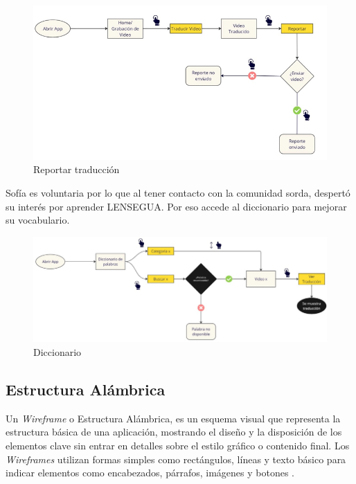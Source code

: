 \begin{figure} [H]
    \centering
    \includegraphics[width=1\linewidth]{figuras/flujo_usuario7.png}
    \caption{Reportar traducción}
    \label{fig:enter-label}
\end{figure}


Sofía es voluntaria por lo que al tener contacto con la comunidad sorda, despertó su interés por aprender LENSEGUA. Por eso accede al diccionario para mejorar su vocabulario. 


\begin{figure} [H]
    \centering
    \includegraphics[width=1\linewidth]{figuras/flujo_usuario8.png}
    \caption{Diccionario}
    \label{fig:enter-label}
\end{figure}



\subsection{Estructura Alámbrica}

Un \textit{Wireframe} o Estructura Alámbrica, es un esquema visual que representa la estructura básica de una aplicación, mostrando el diseño y la disposición de los elementos clave sin entrar en detalles sobre el estilo gráfico o contenido final. Los \textit{Wireframes} utilizan formas simples como rectángulos, líneas y texto básico para indicar elementos como encabezados, párrafos, imágenes y botones \cite{Rees2024}.

